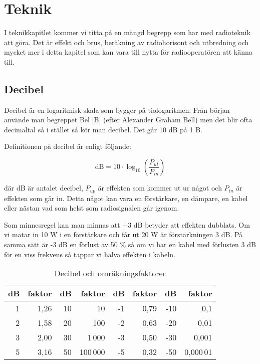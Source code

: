 
\chapter{Teknik}

I teknikkapitlet kommer vi titta på en mängd begrepp som har med radioteknik
att göra. Det är effekt och brus, beräkning av radiohorisont och utbredning
och mycket mer i detta kapitel som kan vara till nytta för radiooperatören att
känna till.

\clearpage

\section{Decibel}

Decibel är en logaritmisk skala som bygger på tiologaritmen. Från början
använde man begreppet Bel [B] (efter Alexander Graham Bell) men det blir ofta
decimaltal så i stället så kör man decibel. Det går 10 dB på 1 B.

Definitionen på decibel är enligt följande:

\begin{equation}
  \text{dB} = 10 \cdot \log_{10} \left( \frac{P_{ut}}{P_{in}} \right)
\end{equation}

där dB är antalet decibel, $P_{up}$ är effekten som kommer ut ur något och
$P_{in}$ är effekten som går in. Detta något kan vara en förstärkare, en
dämpare, en kabel eller nästan vad som helst som radiosignalen går igenom.

Som minnesregel kan man minnas att +3 dB betyder att effekten dubblats. Om vi
matar in 10 W i en förstärkare och får ut 20 W är förstärkningen 3 dB. På
samma sätt är -3 dB en förlust av 50 \% så om vi har en kabel med förlusten 3
dB för en viss frekvens så tappar vi halva effekten i kabeln.

\begin{table}[h]
\centering
\begin{tabular}{rr|rr|rr|rr}
	\bf dB & \bf faktor & \bf dB & \bf faktor & \bf dB & \bf faktor & \bf dB & \bf faktor \\ \hline
	     1 &       1,26 &     10 &         10 &     -1 &       0,79 &    -10 &        0,1 \\
	     2 &       1,58 &     20 &        100 &     -2 &       0,63 &    -20 &       0,01 \\
	     3 &       2,00 &     30 &     1\,000 &     -3 &       0,50 &    -30 &      0,001 \\
	     5 &       3,16 &     50 &   100\,000 &     -5 &       0,32 &    -50 &  0,000\,01
\end{tabular}
\caption{Decibel och omräkningsfaktorer}
\end{table}

